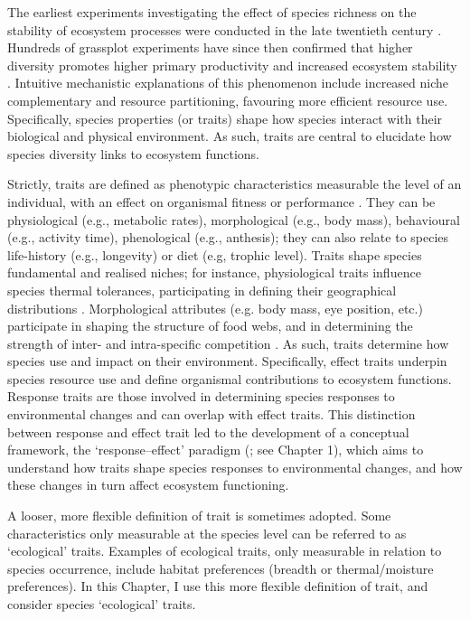 The earliest experiments investigating the effect of species richness on the stability of ecosystem processes were conducted in the late twentieth century \citep{Tilman1994, Naeem1994}. Hundreds of grassplot experiments have since then confirmed that higher diversity promotes higher primary productivity and increased ecosystem stability \citep{Tilman2014, Balvanera2006}. Intuitive mechanistic explanations of this phenomenon include increased niche complementary and resource partitioning, favouring more efficient resource use. Specifically, species properties (or traits) shape how species interact with their biological and physical environment. As such, traits are central to elucidate how species diversity links to ecosystem functions. 

Strictly, traits are defined as phenotypic characteristics measurable the level of an individual, with an effect on organismal fitness or performance \citep{McGill2006, Violle2007}. They can be physiological (e.g., metabolic rates), morphological (e.g., body mass), behavioural (e.g., activity time), phenological (e.g., anthesis); they can also relate to species life-history (e.g., longevity) or diet (e.g, trophic level).
Traits shape species fundamental and realised niches; for instance, physiological traits influence species thermal tolerances, participating in defining their geographical distributions \citep{Calosi2010, Khaliq2017}. Morphological attributes (e.g. body mass, eye position, etc.) participate in shaping the structure of food webs, and in determining the strength of inter- and intra-specific competition \citep{Gravel2016, Laigle2018}. As such, traits determine how species use and impact on their environment. Specifically, effect traits underpin species resource use and define organismal contributions to ecosystem functions. Response traits are those involved in determining species responses to environmental changes and can overlap with effect traits. This distinction between response and effect trait led to the development of a conceptual framework, the `response--effect' paradigm (\cite{Lavorel2002,Luck2012}; see Chapter 1), which aims to understand how traits shape species responses to environmental changes, and how these changes in turn affect ecosystem functioning. 

A looser, more flexible definition of trait is sometimes adopted. Some characteristics only measurable at the species level can be referred to as `ecological' traits. Examples of ecological traits, only measurable in relation to species occurrence, include habitat preferences (breadth or thermal/moisture preferences). In this Chapter, I use this more flexible definition of trait, and consider species `ecological' traits.

